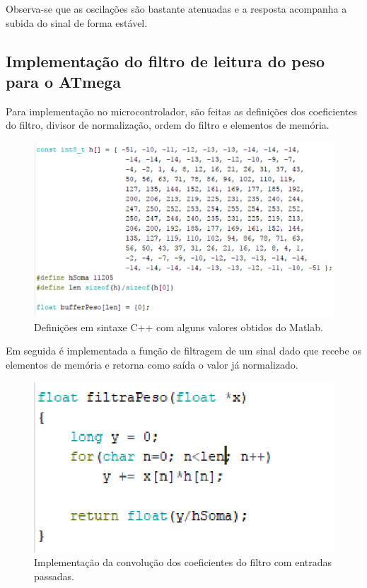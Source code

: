 Observa-se que as oscilações são bastante atenuadas e a resposta acompanha a subida do sinal de forma estável.

\subsection{Implementação do filtro de leitura do peso para o ATmega}

Para implementação no microcontrolador, são feitas as definições dos coeficientes do filtro, divisor de normalização, ordem do filtro e elementos de memória.

\begin{figure}[h]
	\centering
	\includegraphics[keepaspectratio=true,scale=0.7]{figuras/alg0}
	\caption{ Definições em sintaxe C++ com alguns valores obtidos do Matlab.}
	\label{alg0}
\end{figure}

Em seguida é implementada a função de filtragem de um sinal dado que recebe os elementos de memória e retorna como saída o valor já normalizado.

\begin{figure}[h]
	\centering
	\includegraphics[keepaspectratio=true,scale=0.7]{figuras/alg1}
	\caption{ Implementação da convolução dos coeficientes do filtro com entradas passadas.}
	\label{alg1}
\end{figure}

